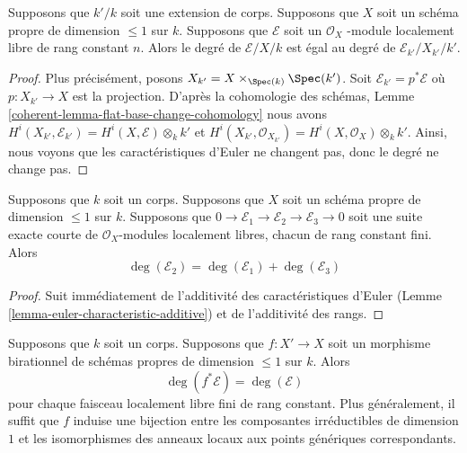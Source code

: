 \begin{lemma}
\label{lemma-degree-base-change}
Supposons que $k'/k$ soit une extension de corps. Supposons
que $X$ soit un schéma propre de dimension $\leq 1$ sur $k$.
Supposons que $\mathcal{E}$ soit un $\mathcal{O}_X$ -module
localement libre de rang constant $n$. Alors le degré de
$\mathcal{E}/X/k$ est égal au degré de $\mathcal{E}_{k'}/X_{k'}/k'$.
\end{lemma}

\begin{proof}
Plus précisément, posons $X_{k'} = X
\times_{\Spec(k)} \Spec(k')$. Soit
$\mathcal{E}_{k'} = p^*\mathcal{E}$ où $p : X_{k'}
\to X$ est la projection. D'après la cohomologie des
schémas, Lemme
\ref{coherent-lemma-flat-base-change-cohomology} nous avons
$H^i(X_{k'}, \mathcal{E}_{k'}) = H^i(X, \mathcal{E})
\otimes_k k'$ et $H^i(X_{k'}, \mathcal{O}_{X_{k'}}) = H^i(X,
\mathcal{O}_X) \otimes_k k'$. Ainsi, nous voyons que les
caractéristiques d'Euler ne changent pas, donc le degré ne change pas.
\end{proof}

\begin{lemma}
\label{lemma-degree-additive}
Supposons que $k$ soit un corps. Supposons que $X$ soit un schéma propre
de dimension $\leq 1$ sur $k$. Supposons que $0 \to \mathcal{E}_1 \to
\mathcal{E}_2 \to \mathcal{E}_3 \to 0$ soit une suite exacte courte de
$\mathcal{O}_X$-modules localement libres, chacun de rang constant fini. Alors
$$
\deg(\mathcal{E}_2) = \deg(\mathcal{E}_1) + \deg(\mathcal{E}_3)
$$
\end{lemma}

\begin{proof}
Suit immédiatement de l'additivité des
caractéristiques d'Euler (Lemme
\ref{lemma-euler-characteristic-additive}) et de l'additivité des rangs.
\end{proof}

\begin{lemma}
\label{lemma-degree-birational-pullback}
Supposons que $k$ soit un corps. Supposons que $f : X' \to X$ soit un
morphisme birationnel de schémas propres de dimension $\leq 1$ sur $k$. Alors
$$
\deg(f^*\mathcal{E}) = \deg(\mathcal{E})
$$
pour chaque faisceau localement libre fini de rang constant.
Plus généralement, il suffit que $f$ induise une bijection
entre les composantes irréductibles de dimension $1$ et les
isomorphismes des anneaux locaux aux points génériques correspondants.
\end{lemma}

